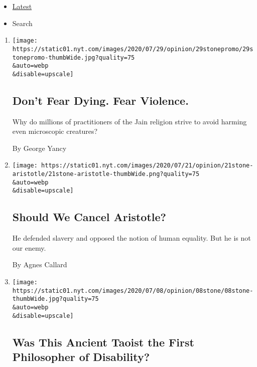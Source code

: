 \begin{itemize}
\tightlist
\item
  \protect\hyperlink{stream-panel}{Latest}
\item
  Search
\end{itemize}

\begin{enumerate}
\def\labelenumi{\arabic{enumi}.}
\item
  \href{/2020/07/29/opinion/jainism-nonviolence-death.html}{}

  \texttt{[image: https://static01.nyt.com/images/2020/07/29/opinion/29stonepromo/29stonepromo-thumbWide.jpg?quality=75\\\&auto=webp\\\&disable=upscale]}

  \hypertarget{dont-fear-dying-fear-violence}{%
  \subsection{Don't Fear Dying. Fear
  Violence.}\label{dont-fear-dying-fear-violence}}

  Why do millions of practitioners of the Jain religion strive to avoid
  harming even microscopic creatures?

  By George Yancy
\item
  \href{/2020/07/21/opinion/should-we-cancel-aristotle.html}{}

  \texttt{[image: https://static01.nyt.com/images/2020/07/21/opinion/21stone-aristotle/21stone-aristotle-thumbWide.png?quality=75\\\&auto=webp\\\&disable=upscale]}

  \hypertarget{should-we-cancel-aristotle}{%
  \subsection{Should We Cancel
  Aristotle?}\label{should-we-cancel-aristotle}}

  He defended slavery and opposed the notion of human equality. But he
  is not our enemy.

  By Agnes Callard
\item
  \href{/2020/07/08/opinion/disability-philosophy-zhuangzi.html}{}

  \texttt{[image: https://static01.nyt.com/images/2020/07/08/opinion/08stone/08stone-thumbWide.jpg?quality=75\\\&auto=webp\\\&disable=upscale]}

  \hypertarget{was-this-ancient-taoist-the-first-philosopher-of-disability}{%
  \subsection{Was This Ancient Taoist the First Philosopher of
  Disability?}\label{was-this-ancient-taoist-the-first-philosopher-of-disability}}


\end{enumerate}
